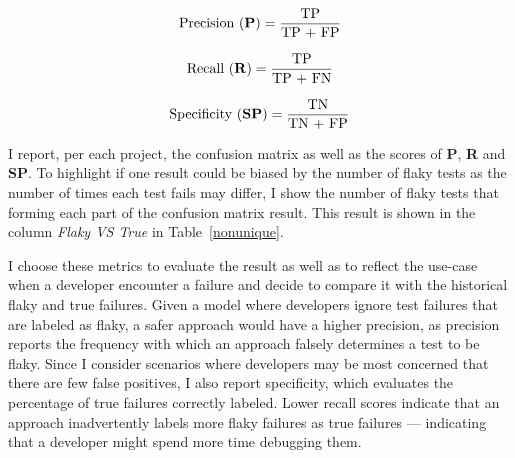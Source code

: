 \begin{equation}
\label{precision}
\text{Precision (\textbf{P})} = \frac{\text{TP}}{\text{TP + FP}}
\end{equation}

\begin{equation}
\label{recall}
\text{Recall (\textbf{R})} = \frac{\text{TP}}{\text{TP + FN}}
\end{equation}

\begin{equation}
\label{specificity}
\text{Specificity (\textbf{SP})} = \frac{\text{TN}}{\text{TN + FP}}
\end{equation}

I report, per each project, the confusion matrix as well as the scores of \textbf{P}, \textbf{R} and \textbf{SP}. To highlight if one result could be biased by the number of flaky tests as the number of times each test fails may differ, I show the number of flaky tests that forming each part of the confusion matrix result. This result is shown in the column \emph{Flaky VS True} in Table~\ref{nonunique}.

I choose these metrics to evaluate the result as well as to reflect the use-case when a developer encounter a failure and decide to compare it with the historical flaky and true failures.
Given a model where developers ignore test failures that are labeled as flaky, a safer approach would have a higher precision, as precision reports the frequency with which an approach falsely determines a test to be flaky.
Since I consider scenarios where developers may be most concerned that there are few false positives, I also report specificity, which evaluates the percentage of true failures correctly labeled. 
Lower recall scores indicate that an approach inadvertently labels more flaky failures as true failures --- indicating that a developer might spend more time debugging them.



